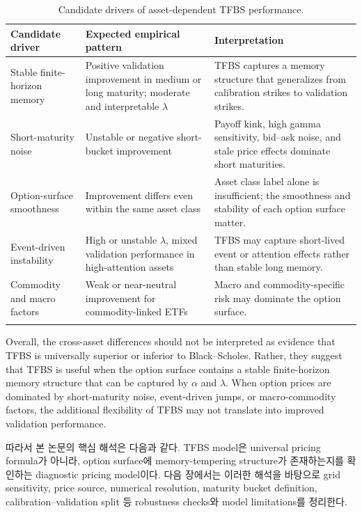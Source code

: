 \documentclass[11pt,a4paper]{report}
\begin{document}
\begin{table}[htbp]
\centering
\small
\begin{tabular}{p{}p{}p{}}
\toprule
Candidate driver & Expected empirical pattern & Interpretation \\
\midrule
Stable finite-horizon memory
&
Positive validation improvement in medium or long maturity; moderate and interpretable \(\lambda\)
&
TFBS captures a memory structure that generalizes from calibration strikes to validation strikes.
\\
\midrule
Short-maturity noise
&
Unstable or negative short-bucket improvement
&
Payoff kink, high gamma sensitivity, bid--ask noise, and stale price effects dominate short maturities.
\\
\midrule
Option-surface smoothness
&
Improvement differs even within the same asset class
&
Asset class label alone is insufficient; the smoothness and stability of each option surface matter.
\\
\midrule
Event-driven instability
&
High or unstable \(\lambda\), mixed validation performance in high-attention assets
&
TFBS may capture short-lived event or attention effects rather than stable long memory.
\\
\midrule
Commodity and macro factors
&
Weak or near-neutral improvement for commodity-linked ETFs
&
Macro and commodity-specific risk may dominate the option surface.
\\
\\
\bottomrule
\end{tabular}
\caption{Candidate drivers of asset-dependent TFBS performance.}
\label{tab:candidate_drivers}
\end{table}

Overall, the cross-asset differences should not be interpreted as evidence that TFBS is universally superior or inferior to Black--Scholes. Rather, they suggest that TFBS is useful when the option surface contains a stable finite-horizon memory structure that can be captured by \(\alpha\) and \(\lambda\). When option prices are dominated by short-maturity noise, event-driven jumps, or macro-commodity factors, the additional flexibility of TFBS may not translate into improved validation performance.

따라서 본 논문의 핵심 해석은 다음과 같다. TFBS model은 universal pricing formula가 아니라, option surface에 memory-tempering structure가 존재하는지를 확인하는 diagnostic pricing model이다. 다음 장에서는 이러한 해석을 바탕으로 grid sensitivity, price source, numerical resolution, maturity bucket definition, calibration--validation split 등 robustness checks와 model limitations를 정리한다.
\end{document}

